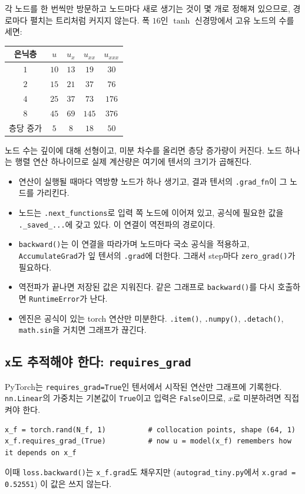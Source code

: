 \documentclass[11pt,a4paper]{article}
\begin{document}
각 노드를 한 번씩만 방문하고 노드마다 새로 생기는 것이 몇 개로 정해져 있으므로, 경로마다 펼치는 트리처럼 커지지 않는다.
폭 $16$인 $\tanh$ 신경망에서 고유 노드의 수를 세면:
\begin{center}
\begin{tabular}{@{}ccccc@{}}
\toprule
은닉층 & $u$ & $u_x$ & $u_{xx}$ & $u_{xxx}$ \\
\midrule
$1$ & $10$ & $13$ & $19$ & $30$ \\
$2$ & $15$ & $21$ & $37$ & $76$ \\
$4$ & $25$ & $37$ & $73$ & $176$ \\
$8$ & $45$ & $69$ & $145$ & $376$ \\
\midrule
층당 증가 & $5$ & $8$ & $18$ & $50$ \\
\bottomrule
\end{tabular}
\end{center}
노드 수는 깊이에 대해 선형이고, 미분 차수를 올리면 층당 증가량이 커진다. 노드 하나는 행렬 연산 하나이므로 실제 계산량은 여기에 텐서의 크기가 곱해진다.

\begin{keybox}[정리]
\begin{itemize}[leftmargin=1.5em]
\item 연산이 실행될 때마다 역방향 노드가 하나 생기고, 결과 텐서의 \texttt{.grad\_fn}이 그 노드를 가리킨다.
\item 노드는 \texttt{.next\_functions}로 입력 쪽 노드에 이어져 있고, 공식에 필요한 값을 \texttt{.\_saved\_...}에 갖고 있다. 이 연결이 역전파의 경로이다.
\item \texttt{backward()}는 이 연결을 따라가며 노드마다 국소 공식을 적용하고, \texttt{AccumulateGrad}가 잎 텐서의 \texttt{.grad}에 더한다. 그래서 step마다 \texttt{zero\_grad()}가 필요하다.
\item 역전파가 끝나면 저장된 값은 지워진다. 같은 그래프로 \texttt{backward()}를 다시 호출하면 \texttt{RuntimeError}가 난다.
\item 엔진은 공식이 있는 torch 연산만 미분한다. \texttt{.item()}, \texttt{.numpy()}, \texttt{.detach()}, \texttt{math.sin}을 거치면 그래프가 끊긴다.
\end{itemize}
\end{keybox}

\subsection{\texttt{x}도 추적해야 한다: \texttt{requires\_grad}}

PyTorch는 \texttt{requires\_grad=True}인 텐서에서 시작된 연산만 그래프에 기록한다.
\texttt{nn.Linear}의 가중치는 기본값이 \texttt{True}이고 입력은 \texttt{False}이므로, $x$로 미분하려면 직접 켜야 한다.
\begin{lstlisting}
x_f = torch.rand(N_f, 1)          # collocation points, shape (64, 1)
x_f.requires_grad_(True)          # now u = model(x_f) remembers how it depends on x_f
\end{lstlisting}
이때 \texttt{loss.backward()}는 \texttt{x\_f.grad}도 채우지만 (\texttt{autograd\_tiny.py}에서 \texttt{x.grad = 0.52551}) 이 값은 쓰지 않는다.
\end{document}
